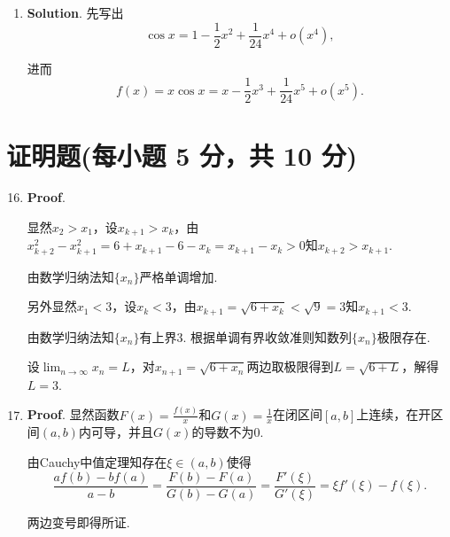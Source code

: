 \documentclass[../Main.tex]{subfiles}
\begin{document}
\begin{enumerate}
          两边对$t$求导得到
          \[
              \frac{\mathrm{d}V}{\mathrm{d}t}=4\pi r^{2}\cdot\frac{\mathrm{d}r}{\mathrm{d}t}
              .
          \]

          代入$\frac{\mathrm{d}V}{\mathrm{d}t}=-2$以及$r=10$解得$\frac{\mathrm{d}r}{\mathrm{d}t}
              =-\frac{1}{200\pi}$.

          即半径以$\frac{1}{200\pi}\mathrm{cm}/\mathrm{min}$的速度减小.

    \item \textbf{Solution}. 先写出
          \[
              \cos x=1-\frac{1}{2}x^{2}+\frac{1}{24}x^{4}+o(x^{4}),
          \]

          进而
          \[
              f(x)=x\cos x=x-\frac{1}{2}x^{3}+\frac{1}{24}x^{5}+o(x^{5}).
          \]
\end{enumerate}

\section{证明题(每小题 5 分，共 10 分)}
\begin{enumerate}
    \setcounter{enumi}{15}
    \item \textbf{Proof}.

          显然$x_{2}>x_{1}$，设$x_{k+1}>x_{k}$，由$x_{k+2}^{2}-x_{k+1}^{2}=6+x_{k+1}-
              6-x_{k}=x_{k+1}-x_{k}>0$知$x_{k+2}>x_{k+1}$.

          由数学归纳法知$\{x_{n}\}$严格单调增加.

          另外显然$x_{1}<3$，设$x_{k}<3$，由$x_{k+1}=\sqrt{6+x_{k}}<\sqrt{9}=3$知$x_{k+1}
              <3$.

          由数学归纳法知$\{x_{n}\}$有上界3. 根据单调有界收敛准则知数列$\{x_{n}\}$极限存在.

          设$\lim_{n\to\infty}x_{n}=L$，对$x_{n+1}=\sqrt{6+x_{n}}$两边取极限得到$L=\sqrt{6+L}$，解得$L
              =3$.

    \item \textbf{Proof}. 显然函数$F(x)=\frac{f(x)}{x}$和$G(x)=\frac{1}{x}$在闭区间$[
                  a,b]$上连续，在开区间$(a,b) $内可导，并且$G(x)$的导数不为0.

          由Cauchy中值定理知存在$\xi\in(a,b)$使得
          \[
              \frac{af(b)-bf(a)}{a-b}=\frac{F(b)-F(a)}{G(b)-G(a)}=\frac{F'(\xi)}{G'(\xi)}
              =\xi f'(\xi)-f(\xi).
          \]

          两边变号即得所证.
\end{enumerate}
\end{document}
